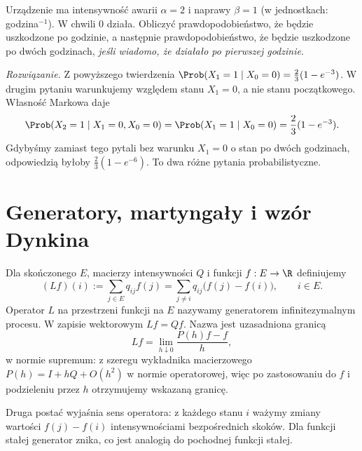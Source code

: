 \begin{zadanie}
Urządzenie ma intensywność awarii $\alpha=2$ i naprawy
$\beta=1$ (w jednostkach: godzina$^{-1}$).
W chwili $0$ działa. Obliczyć prawdopodobieństwo,
że będzie uszkodzone po godzinie, a następnie
prawdopodobieństwo, że będzie uszkodzone po dwóch godzinach,
\emph{jeśli wiadomo, że działało po pierwszej godzinie}.

\emph{Rozwiązanie.} Z powyższego twierdzenia
$\Prob(X_1=1\mid X_0=0)=\tfrac23(1-e^{-3})$.
W drugim pytaniu warunkujemy względem stanu $X_1=0$,
a nie stanu początkowego. Własność Markowa daje
\[
\Prob(X_2=1\mid X_1=0,X_0=0)
=\Prob(X_1=1\mid X_0=0)=\frac23(1-e^{-3}).
\]
Gdybyśmy zamiast tego pytali bez warunku $X_1=0$
o stan po dwóch godzinach, odpowiedzią byłoby
$\tfrac23(1-e^{-6})$. To dwa różne pytania probabilistyczne.
\end{zadanie}

\section{Generatory, martyngały i wzór Dynkina}
\begin{definicja}
Dla skończonego $E$, macierzy intensywności $Q$ i funkcji
$f:E\to\R$ definiujemy
\[
(Lf)(i):=\sum_{j\in E}q_{ij}f(j)
=\sum_{j\ne i}q_{ij}\bigl(f(j)-f(i)\bigr),\qquad i\in E.
\]
Operator $L$ na przestrzeni funkcji na $E$ nazywamy
generatorem infinitezymalnym procesu. W zapisie wektorowym
$Lf=Qf$. Nazwa jest uzasadniona granicą
\[
Lf=\lim_{h\downarrow0}\frac{P(h)f-f}{h},
\]
w normie supremum: z szeregu wykładnika macierzowego
$P(h)=I+hQ+O(h^2)$ w normie operatorowej, więc
po zastosowaniu do $f$ i podzieleniu przez $h$
otrzymujemy wskazaną granicę.
\end{definicja}

Druga postać wyjaśnia sens operatora: z każdego stanu $i$
ważymy zmiany wartości $f(j)-f(i)$ intensywnościami
bezpośrednich skoków. Dla funkcji stałej generator znika,
co jest analogią do pochodnej funkcji stałej.

